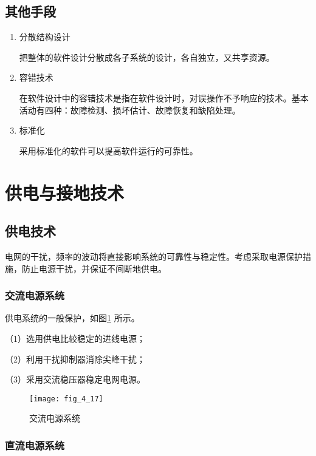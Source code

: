 \subsection{其他手段}

\begin{enumerate}
  \item 分散结构设计

把整体的软件设计分散成各子系统的设计，各自独立，又共享资源。
\item 容错技术

在软件设计中的容错技术是指在软件设计时，对误操作不予响应的技术。基本活动有四种：故障检测、损坏估计、故障恢复和缺陷处理。
\item 标准化

采用标准化的软件可以提高软件运行的可靠性。

\end{enumerate}





\section{供电与接地技术}


\subsection{供电技术}
电网的干扰，频率的波动将直接影响系统的可靠性与稳定性。考虑采取电源保护措施，防止电源干扰，并保证不间断地供电。

\subsubsection{交流电源系统}

供电系统的一般保护，如图\ref{fig_4_17} 所示。

（1）选用供电比较稳定的进线电源；

（2）利用干扰抑制器消除尖峰干扰；

（3）采用交流稳压器稳定电网电源。
\begin{figure}[h]
  \centering
  \texttt{[image: fig\_4\_17]}\\
  \caption{交流电源系统}\label{fig_4_17}
\end{figure}




\subsubsection{直流电源系统}

